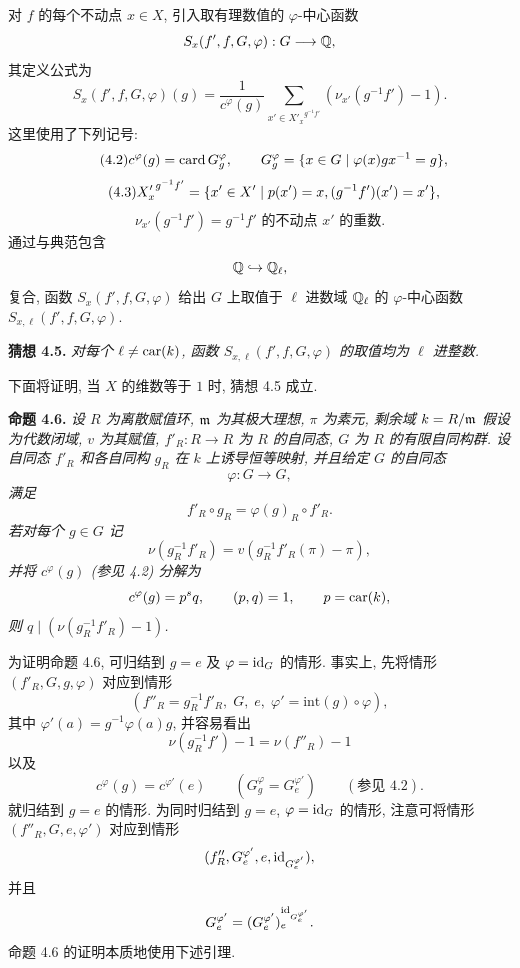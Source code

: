 对 $f$ 的每个不动点 $x\in X$, 引入取有理数值的 $\varphi$-中心函数
\[
S_x(f',f,G,\varphi):G\longrightarrow \mathbb Q,
\]
其定义公式为
\begin{equation}\tag{4.1}
S_x(f',f,G,\varphi)(g)=
\frac{1}{c^\varphi(g)}
\sum_{x'\in {X'_x}^{g^{-1}f'}}(\nu_{x'}(g^{-1}f')-1).
\end{equation}
这里使用了下列记号:
\begin{equation}\tag{4.2}
c^\varphi(g)=\operatorname{card} G_g^\varphi,
\qquad
G_g^\varphi=\{x\in G\mid \varphi(x)gx^{-1}=g\},
\end{equation}
\begin{equation}\tag{4.3}
{X'_x}^{g^{-1}f'}=\{x'\in X'\mid p(x')=x,\\ (g^{-1}f')(x')=x'\},
\end{equation}
\begin{equation}\tag{4.4}
\nu_{x'}(g^{-1}f')=\text{$g^{-1}f'$ 的不动点 }x'\text{ 的重数}.
\end{equation}
通过与典范包含
\[
\mathbb Q\hookrightarrow \mathbb Q_\ell,
\]
复合, 函数 $S_x(f',f,G,\varphi)$ 给出 $G$ 上取值于 $\ell$ 进数域 $\mathbb Q_\ell$ 的 $\varphi$-中心函数 $S_{x,\ell}(f',f,G,\varphi)$.

\medskip
\noindent
\textbf{猜想 4.5.} \emph{对每个 $\ell\ne\operatorname{car}(k)$, 函数 $S_{x,\ell}(f',f,G,\varphi)$ 的取值均为 $\ell$ 进整数.}

\medskip
下面将证明, 当 $X$ 的维数等于 $1$ 时, 猜想 4.5 成立.

\medskip
\noindent
\textbf{命题 4.6.} \emph{设 $R$ 为离散赋值环, $\mathfrak m$ 为其极大理想, $\pi$ 为素元, 剩余域 $k=R/\mathfrak m$ 假设为代数闭域, $v$ 为其赋值, $f'_R:R\to R$ 为 $R$ 的自同态, $G$ 为 $R$ 的有限自同构群. 设自同态 $f'_R$ 和各自同构 $g_R$ 在 $k$ 上诱导恒等映射, 并且给定 $G$ 的自同态
\[
\varphi:G\longrightarrow G,
\]
满足
\[
f'_R\circ g_R=\varphi(g)_R\circ f'_R.
\]
若对每个 $g\in G$ 记
\[
\nu(g_R^{-1}f'_R)=v(g_R^{-1}f'_R(\pi)-\pi),
\]
并将 $c^\varphi(g)$ (参见 4.2) 分解为
\[
c^\varphi(g)=p^sq,
\qquad (p,q)=1,
\qquad p=\operatorname{car}(k),
\]
则 $q\mid(\nu(g_R^{-1}f'_R)-1)$.}

\medskip
为证明命题 4.6, 可归结到 $g=e$ 及 $\varphi=\operatorname{id}_G$ 的情形. 事实上, 先将情形 $(f'_R,G,g,\varphi)$ 对应到情形
\[
(f''_R=g_R^{-1}f'_R,
\; G,
\; e,
\; \varphi'=\mathrm{int}(g)\circ\varphi),
\]
其中 $\varphi'(a)=g^{-1}\varphi(a)g$, 并容易看出
\[
\nu(g_R^{-1}f')-1=\nu(f''_R)-1
\]
以及
\[
c^\varphi(g)=c^{\varphi'}(e)\qquad (G_g^\varphi=G_e^{\varphi'})\qquad (\text{参见 4.2}).
\]
就归结到 $g=e$ 的情形. 为同时归结到 $g=e$, $\varphi=\operatorname{id}_G$ 的情形, 注意可将情形 $(f''_R,G,e,\varphi')$ 对应到情形
\[
(f''_R,G_e^{\varphi'},e,\operatorname{id}_{G_e^{\varphi'}}),
\]
并且
\[
G_e^{\varphi'}=(G_e^{\varphi'})_e^{\operatorname{id}_{G_e^{\varphi'}}}.
\]
命题 4.6 的证明本质地使用下述引理.

